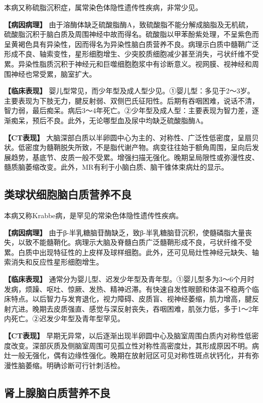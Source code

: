 本病又称硫脂沉积症，属常染色体隐性遗传性疾病，非常少见。

\textbf{【病因病理】}
由于溶酶体缺乏硫酸脂酶A，致硫酸脂不能分解成脑脂及无机硫，硫酸脂沉积于脑白质及周围神经中故而得名。硫酸脂以甲苯酚紫处理，不呈紫色而呈黄褐色具有异染性，因而得名为异染性脑白质营养不良。病理示白质中髓鞘广泛形成不良、轴索变性，星形细胞增生、少突胶质细胞减少甚至消失，弓状纤维不受累。异染性脂质沉积于神经元和巨噬细胞胞浆中有诊断意义。视网膜、视神经和周围神经也常受累，脑室扩大。

\textbf{【临床表现】}
婴儿型常见，而少年型及成人型少见。①婴儿型：多见于2～3岁。主要表现为下肢无力，腱反射弱、双侧巴氏征阳性。后期有吞咽困难，说话不清，智力弱，最后痴呆。病后3～4年死亡。②少年型及成人型：主要表现为智力差，逐渐痴呆，预后不良。此外，无论哪型血及尿中均缺乏硫酸脂酶A。

\textbf{【CT表现】}
大脑深部白质以半卵圆中心为主的、对称性、广泛性低密度，呈扇贝状。低密度为髓鞘脱失所致，不是脂代谢产物。病变往往始于额角周围，呈向后发展趋势，基底节、皮质一般不受累。增强扫描无强化。晚期呈局限性或弥漫性皮、髓质脑萎缩改变。此外，MR有利于小脑白质、脑干锥体束病灶的显示。

\subsection{类球状细胞脑白质营养不良}

本病又称Krabbe病，是罕见的常染色体隐性遗传性疾病。

\textbf{【病因病理】}
由于β-半乳糖脑苷酶缺乏，致β-半乳糖脑苷沉积，使髓磷脂大量丧失，以致不能髓鞘化。病理示大脑及脊髓白质广泛髓鞘形成不良，弓状纤维不受累。白质中出现特征性的上皮样及球样细胞。此外，还可见局灶性神经元缺失、轴索消失和反应性星形细胞增生。

\textbf{【临床表现】}
通常分为婴儿型、迟发少年型及青年型。①婴儿型多为3～6个月时发病，烦躁、呕吐、惊厥、发热、精神迟滞。有快速自发性眼颤和体温不稳两个临床特点。以后智力与发育退化，视力障碍、皮质盲、视神经萎缩，肌力增高，腱反射亢进。晚期去皮质强直、感觉与深反射丧失，吞咽困难，肌张力低，多于1～2年内死亡。②迟发少年型及青年型罕见。

\textbf{【CT表现】}
早期无异常，以后逐渐出现半卵圆中心及脑室周围白质内对称性低密度改变。深部灰质及侧脑室周围可见孤立性对称性高密度灶，其形成原因不明。病灶一般无强化，偶有边缘性强化。晚期在放射冠区可见对称性斑点状钙化，并有弥漫性脑萎缩。明确诊断可行针刺活检。

\subsection{肾上腺脑白质营养不良}

